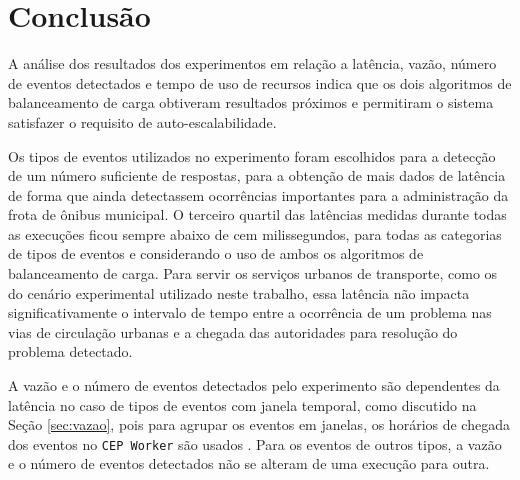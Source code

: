 





\newpage
\section{Conclusão}


A análise dos resultados dos experimentos em relação a latência, vazão, número de eventos detectados e tempo de uso de recursos indica que os dois algoritmos de balanceamento de carga obtiveram resultados próximos e permitiram o sistema satisfazer o requisito de auto-escalabilidade. 

Os tipos de eventos utilizados no experimento foram escolhidos para a detecção de um número suficiente de respostas, para a obtenção de mais dados de latência de forma que ainda detectassem ocorrências importantes para a administração da frota de ônibus municipal. O terceiro quartil das latências medidas durante todas as execuções ficou sempre abaixo de cem milissegundos, para todas as categorias de tipos de eventos e considerando o uso de ambos os algoritmos de balanceamento de carga. Para servir os serviços urbanos de transporte, como os do cenário experimental utilizado neste trabalho, essa latência não impacta significativamente o intervalo de tempo entre a  ocorrência de um problema nas vias de circulação urbanas e a chegada das autoridades para resolução do problema detectado. 


A vazão e o número de eventos detectados pelo experimento são dependentes da latência no caso de tipos de eventos com janela temporal, como discutido na Seção \ref{sec:vazao}, pois para agrupar os eventos em janelas, os horários de chegada dos eventos no \texttt{CEP Worker} são usados%
. Para os eventos de outros tipos, a vazão e o número de eventos detectados não se alteram de uma execução para outra.

